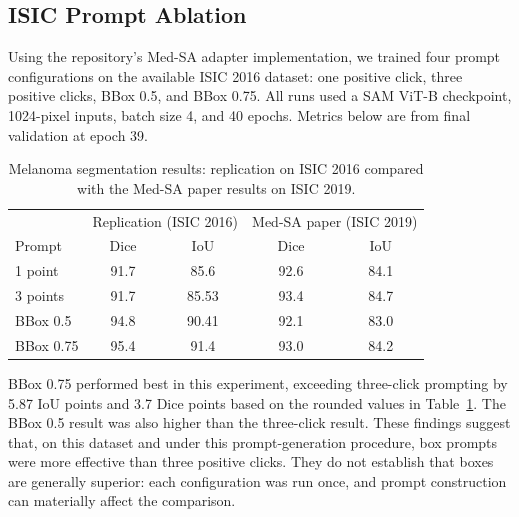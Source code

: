 \subsection{ISIC Prompt Ablation}

Using the repository's Med-SA adapter implementation, we trained four prompt
configurations on the available ISIC 2016 dataset: one positive click, three
positive clicks, BBox 0.5, and BBox 0.75. All runs used a SAM ViT-B checkpoint,
1024-pixel inputs, batch size 4, and 40 epochs. Metrics below are from final
validation at epoch 39.

\begin{table}[t]
    \centering
    \caption{Melanoma segmentation results: replication on ISIC 2016 compared with the Med-SA paper results on ISIC 2019.}
    \label{tab:melanoma_prompt_comparison}
    \begin{tabular}{lcccc}
        \hline
        & \multicolumn{2}{c}{Replication (ISIC 2016)}
        & \multicolumn{2}{c}{Med-SA paper (ISIC 2019)} \\
        Prompt & Dice & IoU & Dice & IoU \\
        \hline
        1 point     & 91.7 & 85.6  & 92.6 & 84.1 \\
        3 points    & 91.7 & 85.53 & 93.4 & 84.7 \\
        BBox 0.5    & 94.8 & 90.41 & 92.1 & 83.0 \\
        BBox 0.75   & 95.4 & 91.4  & 93.0 & 84.2 \\
        \hline
    \end{tabular}
\end{table}

BBox 0.75 performed best in this experiment, exceeding three-click prompting
by 5.87 IoU points and 3.7 Dice points based on the rounded values in
Table~\ref{tab:melanoma_prompt_comparison}. The BBox 0.5 result was also higher
than the three-click result. These findings suggest that, on this dataset and
under this prompt-generation procedure, box prompts were more effective than
three positive clicks. They do not establish that boxes are generally superior:
each configuration was run once, and prompt construction can materially affect
the comparison.

